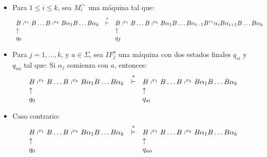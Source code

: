 \begin{frame}
  \begin{itemize}
    \item Para $1 \leq i \leq k$, sea $M_{i}^{\curvearrowright}$ una máquina tal que:
    \[
      \begin{array}{lcl}
        B \shortmid^{x_{1}} B \dotsc B \shortmid^{x_{k}} B \alpha_{1} B \dotsc B \alpha_{k} &\overset{\ast}{\vdash}& B
          \shortmid^{x_{1}} B \dotsc B \shortmid^{x_{k}} B \alpha_{1} B \dotsc B \alpha_{i-1} B^{\curvearrowright}
          \alpha_{i} B \alpha_{i+1} B \dotsc B \alpha_{k} \\
        \uparrow && \uparrow \\
        q_{0} && q_{f}
      \end{array}
    \]

    \item Para $j=1, \dotsc, k$, y $a \in \Sigma$, sea $IF_{j}^{a}$ una máquina con dos estados finales $q_{si}$ y
    $q_{no}$ tal que:
    \PN Si $\alpha_{j}$ comienza con $a$, entonces:
    \[
      \begin{array}{lcl}
        B \shortmid^{x_{1}} B \dotsc B \shortmid^{x_{k}} B \alpha_{1} B \dotsc B \alpha_{k} &\overset{\ast}{\vdash}& B
          \shortmid^{x_{1}} B \dotsc B \shortmid^{x_{k}} B \alpha_{1} B \dotsc B \alpha_{k} \\
        \uparrow && \uparrow \\
        q_{0} && q_{si}
      \end{array}
    \]

    \item Caso contrario:
    \[
      \begin{array}{lcl}
        B \shortmid^{x_{1}} B \dotsc B \shortmid^{x_{k}} B \alpha_{1} B \dotsc B \alpha_{k} &\overset{\ast}{\vdash}& B
          \shortmid^{x_{1}} B \dotsc B \shortmid^{x_{k}} B \alpha_{1} B \dotsc B \alpha_{k} \\
        \uparrow && \uparrow \\
        q_{0} && q_{no}
      \end{array}
    \]
  \end{itemize}
\end{frame}
